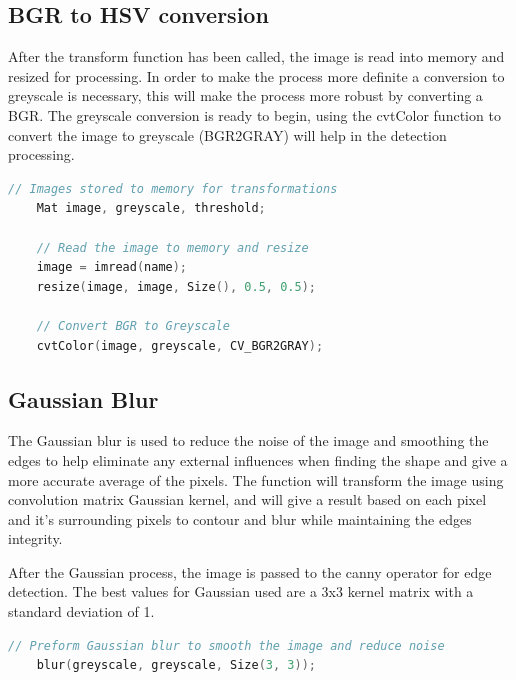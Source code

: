 \documentclass[a4paper, 10pt]{article}
\begin{document}

\subsection{BGR to HSV conversion}

After the transform function has been called, the image is read into memory and resized for processing. In order to make the process more definite a conversion to greyscale is necessary, this will make the process more robust by converting a BGR. The greyscale conversion is ready to begin, using the cvtColor function to convert the image to greyscale (BGR2GRAY) will help in the detection processing.

\begin{lstlisting}[language = C++]
	// Images stored to memory for transformations
	Mat image, greyscale, threshold;

	// Read the image to memory and resize
	image = imread(name);   
	resize(image, image, Size(), 0.5, 0.5);

	// Convert BGR to Greyscale
	cvtColor(image, greyscale, CV_BGR2GRAY);
\end{lstlisting}


\subsection{Gaussian Blur}

The Gaussian blur is used to reduce the noise of the image and smoothing the edges to help eliminate any external influences when finding the shape and give a more accurate average of the pixels. The function will transform the image using convolution matrix Gaussian kernel, and will give a result based on each pixel and it's surrounding pixels to contour and blur while maintaining the edges integrity.

After the Gaussian process, the image is passed to the canny operator for edge detection. The best values for Gaussian used are a 3x3 kernel matrix with a standard deviation of 1.

\begin{lstlisting}[language = C++]
	// Preform Gaussian blur to smooth the image and reduce noise
	blur(greyscale, greyscale, Size(3, 3));
\end{lstlisting}
\end{document}
